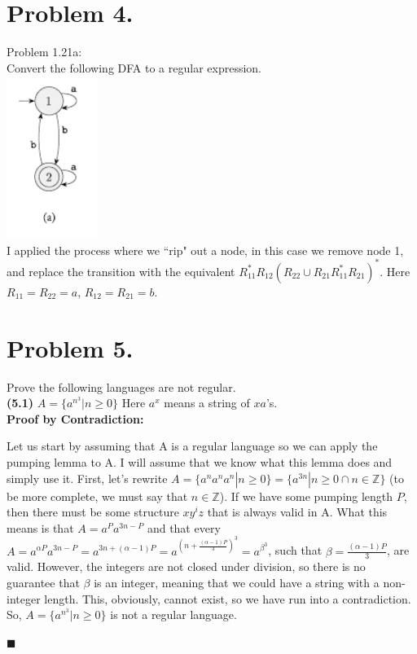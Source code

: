 \documentclass[11pt]{article}
\begin{document}
\section*{Problem 4.}
Problem 1.21a:\\
    Convert the following DFA to a regular expression.\\
    \includegraphics[height = 150pt]{images/1.21a.PNG}\\
    I applied the process where we ``rip" out a node, in this case we remove node 1, and replace the transition with the equivalent $R_{11}^* R_{12} (R_{22} \cup R_{21}R_{11}^*R_{21})^*$. Here $R_{11} = R_{22} = a$, $R_{12} = R_{21} = b$.
    \begin{center}
    \end{center}
\newpage





\section*{Problem 5.}
Prove the following languages are not regular.\\

\textbf{(5.1)} $A=\{a^{n^3}|n\geq 0\}$ Here $a^x$ means a string of $x a$'s.\\

\textbf{Proof by Contradiction:}

Let us start by assuming that A is a regular language so we can apply the pumping lemma to A. I will assume that we know what this lemma does and simply use it. First, let's rewrite $A = \{a^n a^n a^n | n \geq 0\} = \{a^{3n} | n\geq 0 \cap n \in \mathbb{Z}\}$ (to be more complete, we must say that $n\in \mathbb{Z}$). If we have some pumping length $P$, then there must be some structure $xy^i z$ that is always valid in A. What this means is that $A = a^P a^{3n-P}$ and that every $A = a^{\alpha P} a^{3n-P} = a^{3n + (\alpha-1)P} = a^{(n+\frac{(\alpha -1)P}{3})^3} = a^{\beta^3}$, such that $\beta = \frac{(\alpha-1)P}{3}$, are valid. However, the integers are not closed under division, so there is no guarantee that $\beta$ is an integer, meaning that we could have a string with a non-integer length. This, obviously, cannot exist, so we have run into a contradiction. So, $A=\{a^{n^3} | n\geq 0\}$ is not a regular language.
\begin{flushright}$\blacksquare$\end{flushright}
\end{document}
